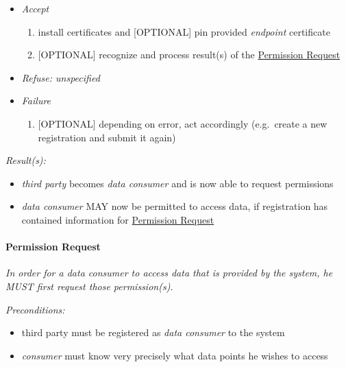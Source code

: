 \documentclass[12pt,english,a4paper,titlepage,cleardoublepage=empty,dottedtoc]{report}
\providecommand{\tightlist}{%
  \setlength{\itemsep}{0pt}\setlength{\parskip}{0pt}}
\begin{document}
\begin{enumerate}
  \begin{itemize}
  \item
    \emph{Accept}

    \begin{enumerate}
    \def\labelenumii{\arabic{enumii})}
    \tightlist
    \item
      install certificates and {[}OPTIONAL{]} pin provided
      \emph{endpoint} certificate
    \item
      {[}OPTIONAL{]} recognize and process result(s) of the
      \protect\hyperlink{-permission-request}{Permission Request}
    \end{enumerate}
  \item
    \emph{Refuse: unspecified}
  \item
    \emph{Failure}

    \begin{enumerate}
    \def\labelenumii{\arabic{enumii})}
    \tightlist
    \item
      {[}OPTIONAL{]} depending on error, act accordingly (e.g.~create a
      new registration and submit it again)
    \end{enumerate}
  \end{itemize}
\end{enumerate}

\emph{Result(s):}

\begin{itemize}
\tightlist
\item
  \emph{third party} becomes \emph{data consumer} and is now able to
  request permissions
\item
  \emph{data consumer} MAY now be permitted to access data, if
  registration has contained information for
  \protect\hyperlink{-permission-request}{Permission Request}
\end{itemize}

\hypertarget{permission-request}{\paragraph{Permission
Request}\label{permission-request}}

\emph{In order for a data consumer to access data that is provided by
the system, he MUST first request those permission(s).}

\emph{Preconditions:}

\begin{itemize}
\tightlist
\item
  third party must be registered as \emph{data consumer} to the system
\item
  \emph{consumer} must know very precisely what data points he wishes to
  access
\end{itemize}
\end{document}
